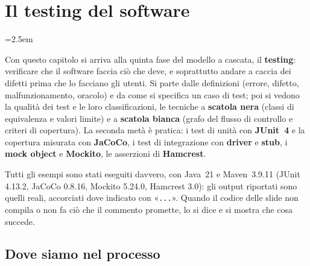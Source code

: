 \chapter{Il testing del software}
\label{cap:testing}
\emergencystretch=2.5em

Con questo capitolo si arriva alla quinta fase del modello a cascata, il \textbf{testing}: verificare che il software
faccia ciò che deve, e soprattutto andare a caccia dei difetti prima che lo facciano gli utenti. Si parte dalle
definizioni (errore, difetto, malfunzionamento, oracolo) e da come si specifica un caso di test; poi si vedono la qualità
dei test e le loro classificazioni, le tecniche a \textbf{scatola nera} (classi di equivalenza e valori limite) e a
\textbf{scatola bianca} (grafo del flusso di controllo e criteri di copertura). La seconda metà è pratica: i test di
unità con \textbf{JUnit~4} e la copertura misurata con \textbf{JaCoCo}, i test di integrazione con \textbf{driver} e
\textbf{stub}, i \textbf{mock object} e \textbf{Mockito}, le asserzioni di \textbf{Hamcrest}.

Tutti gli esempi sono stati eseguiti davvero, con Java~21 e Maven~3.9.11 (JUnit 4.13.2, JaCoCo 0.8.16, Mockito
5.24.0, Hamcrest 3.0): gli output riportati sono quelli reali, accorciati dove indicato con «\texttt{...}». Quando il
codice delle slide non compila o non fa ciò che il commento promette, lo si dice e si mostra che cosa succede.


\section{Dove siamo nel processo}

